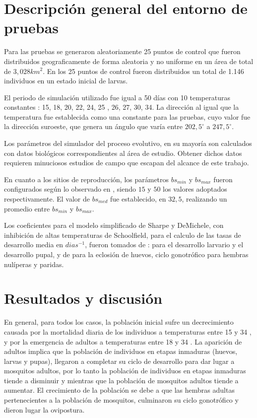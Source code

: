 \section{Descripción general del entorno de pruebas}
Para las pruebas se generaron aleatoriamente 25 puntos de control que fueron distribuidos
geograficamente de forma aleatoria y no uniforme en un área de total de $3,028 km^{2}$. En los 25
puntos de control fueron distribuidos un total de 1.146 individuos en un estado inicial de larvas.

El periodo de simulación utilizado fue igual a 50 días con 10 temperaturas constantes :
15\textcelsius , 18\textcelsius , 20\textcelsius , 22\textcelsius , 24\textcelsius , 25\textcelsius
, 26\textcelsius , 27\textcelsius , 30\textcelsius , 34\textcelsius. La dirección al igual que la
temperatura fue establecida como una constante para las pruebas, cuyo valor fue la dirección
suroeste, que genera un ángulo que varía entre $202,5^{\circ}$ a $247,5^{\circ}$.

Los parámetros del simulador del proceso evolutivo, en su mayoría son calculados con datos
biológicos correspondientes al área de estudio. Obtener dichos datos requieren minuciosos estudios
de campo que escapan del alcance de este trabajo.

En cuanto a los sitios de reproducción, los parámetros $bs_{min}$ y $bs_{max}$ fueron
configurados según lo observado en \cite{otero2006stochastic, otero2008stochastic}, siendo $15$ y
$50$ los valores adoptados respectivamente.  El valor de $bs_{med}$ fue establecido, en $32,5$,
realizando un promedio entre $bs_{min}$ y $bs_{max}$.

Los coeficientes para el modelo simplificado de Sharpe y DeMichele, con inhibición de altas
temperaturas de Schoolfield, para el calculo de las tasas de desarrollo media en $dias^{-1}$,
fueron tomados de :  \cite{rueda1990temperature} para el desarrollo larvario y el desarrollo
pupal, y de  \cite{otero2006stochastic} para la eclosión de huevos, ciclo gonotrófico para hembras
nulíperas y paridas.

\section{Resultados y discusión}

En general, para todos los casos, la población inicial sufre un decrecimiento causada por la
mortalidad diaria de los individuos a temperaturas entre 15 y 34 \textcelsius, y por la emergencia
de adultos a temperaturas entre 18 y 34 \textcelsius. La aparición de adultos implica que la
población de individuos en etapas inmaduras (huevos, larvas y pupas), llegaron a completar su
ciclo de desarrollo para dar lugar a mosquitos adultos, por lo tanto la población de individuos en
etapas inmaduras tiende a disminuir y mientras que la población de mosquitos adultos tiende a
aumentar. El crecimiento de la población se debe a que las hembras adultas pertenecientes a la
población de mosquitos, culminaron su ciclo gonotrófico y dieron lugar la ovipostura.


